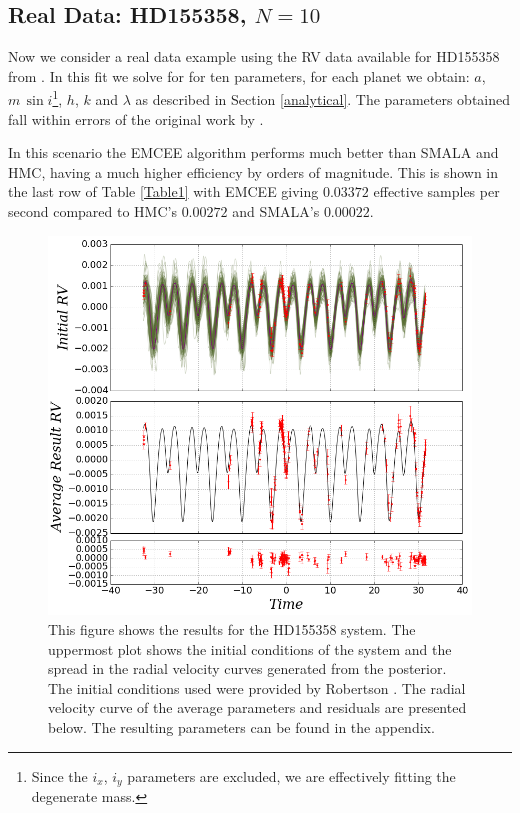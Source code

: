 \documentclass{aa}
\begin{document}
\subsection{Real Data: HD155358, $N=10$}

Now we consider a real data example using the RV data available for HD155358 from \cite{Robertson2012}. 
In this fit we solve for for ten parameters, for each planet we obtain: $a$, $m\, \sin i$\footnote{Since the $i_x$, $i_y$ parameters are excluded, we are effectively fitting the degenerate mass.}, $h$, $k$ and $\lambda$ as described in Section \ref{analytical}. 
The parameters obtained fall within errors of the original work by \cite{Robertson2012}.

In this scenario the EMCEE algorithm performs much better than SMALA and HMC, having a much higher efficiency by orders of magnitude. 
This is shown in the last row of Table \ref{Table1} with EMCEE giving $0.03372$ effective samples per second compared to HMC's $0.00272$ and SMALA's $0.00022$.

\begin{figure}
\centering
\includegraphics[width=0.95\hsize]{rv3-1.png}
   \caption{This figure shows the results for the HD155358 system. 
The uppermost plot shows the initial conditions of the system and the spread in the radial velocity curves generated from the posterior. 
The initial conditions used were provided by Robertson \cite{Robertson2012}. 
The radial velocity curve of the average parameters and residuals are presented below. 
The resulting parameters can be found in the appendix.}
      \label{FigHD}
\end{figure}
\end{document}
